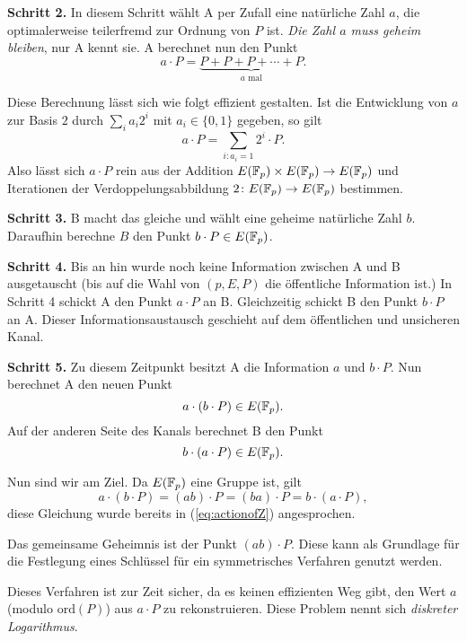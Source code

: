 \bigskip
\textbf{Schritt 2.} In diesem Schritt wählt A per Zufall eine
natürliche Zahl $a$, die optimalerweise teilerfremd zur Ordnung von
$P$ ist. \emph{Die Zahl $a$ muss geheim bleiben}, nur A kennt sie. A berechnet nun den Punkt
$$
a\cdot P = \underbrace{P+P+P+\cdots + P}_{\text{$a$ mal}}.
$$

Diese Berechnung lässt sich wie folgt effizient gestalten.
Ist die Entwicklung von $a$ zur Basis $2$ durch $\sum_{i} a_i 2^i$ mit
$a_{i}\in \{0,1\}$ gegeben, so gilt
$$
a\cdot P =\sum_{i : a_i=1} 2^i \cdot P.$$
Also lässt sich $a \cdot P$ rein aus der  Addition $E({\mathbb{F}}_p)\times
E({\mathbb{F}}_p)\rightarrow E({\mathbb{F}}_p)$  und Iterationen der
Verdoppelungsabbildung  $2\colon E({\mathbb{F}}_p)\rightarrow E({\mathbb{F}}_p)$
bestimmen. 

\bigskip
\textbf{Schritt 3.} B macht das gleiche und wählt eine geheime natürliche Zahl
$b$. Daraufhin berechne $B$ den Punkt $b\cdot P \in E({\mathbb{F}}_p)$.

\bigskip
\textbf{Schritt 4.} Bis an hin wurde noch keine Information zwischen A
und B ausgetauscht (bis auf die Wahl von $(p,E,P)$ die öffentliche
Information ist.)
In Schritt 4 schickt A den Punkt $a\cdot P$ an B. Gleichzeitig schickt
B den Punkt
$b\cdot P$ an A. Dieser Informationsaustausch geschieht auf dem
öffentlichen und unsicheren Kanal. 


\bigskip
\textbf{Schritt 5.} Zu diesem Zeitpunkt besitzt A die Information $a$
und $b\cdot P$. Nun berechnet A den neuen Punkt
\begin{equation*}
  a\cdot (b\cdot P) \in E({\mathbb{F}}_p).
\end{equation*}
Auf der anderen Seite des Kanals berechnet B den Punkt
\begin{equation*}
  b\cdot (a\cdot P) \in E({\mathbb{F}}_p).
\end{equation*}

Nun sind wir am Ziel. Da $E({\mathbb{F}}_p)$ eine Gruppe ist,
gilt
$$
a\cdot (b\cdot P) = (ab)\cdot P = (ba) \cdot P = b\cdot (a\cdot P),$$
diese Gleichung wurde bereits in (\ref{eq:actionofZ}) angesprochen.

Das gemeinsame Geheimnis ist der Punkt $(ab)\cdot P$. Diese kann als
Grundlage für die Festlegung eines Schlüssel für ein symmetrisches
Verfahren genutzt werden.

\bigskip

Dieses Verfahren ist zur Zeit sicher, da es  keinen  effizienten Weg
gibt, den Wert $a$ (modulo $\mathrm{ord}(P)$)
aus $a\cdot P$ zu rekonstruieren. Diese Problem nennt sich
\emph{diskreter Logarithmus}.

